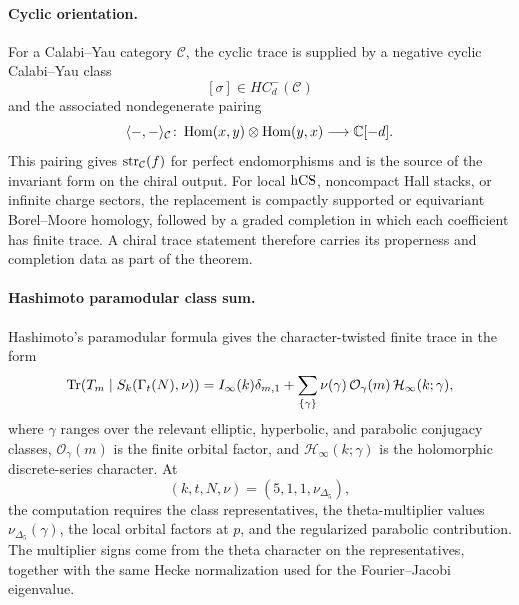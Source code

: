 \paragraph{Cyclic orientation.}
For a Calabi--Yau category \(\mathcal C\), the cyclic trace is supplied
by a negative cyclic Calabi--Yau class
\[
  [\sigma]\in HC^-_d(\mathcal C)
\]
and the associated nondegenerate pairing
\[
  \langle-,-\rangle_{\mathcal C}\colon
  \operatorname{Hom}(x,y)\otimes\operatorname{Hom}(y,x)\longrightarrow
  \mathbb{C}[-d].
\]
This pairing gives \(\operatorname{str}_{\mathcal C}(f)\) for perfect endomorphisms
and is the source of the invariant form on the chiral output.  For
local \(\mathrm{hCS}\), noncompact Hall stacks, or infinite charge sectors, the
replacement is compactly supported or equivariant Borel--Moore
homology, followed by a graded completion in which each coefficient has
finite trace.  A chiral trace statement therefore carries its
properness and completion data as part of the theorem.

\paragraph{Hashimoto paramodular class sum.}
Hashimoto's paramodular formula gives the character-twisted finite
trace in the form
\[
\operatorname{Tr}\!\left(T_m\mid S_k(\Gamma_t(N),\nu)\right)
 =
 I_\infty(k)\delta_{m,1}
 +\sum_{\{\gamma\}}
   \nu(\gamma)\,\mathcal O_\gamma(m)\,
   \mathcal H_\infty(k;\gamma),
\]
where \(\gamma\) ranges over the relevant elliptic, hyperbolic, and
parabolic conjugacy classes, \(\mathcal O_\gamma(m)\) is the finite
orbital factor, and \(\mathcal H_\infty(k;\gamma)\) is the holomorphic
discrete-series character.  At
\[
  (k,t,N,\nu)=(5,1,1,\nu_{\Delta_5}),
\]
the computation requires the class representatives, the theta-multiplier
values \(\nu_{\Delta_5}(\gamma)\), the local orbital factors at \(p\),
and the regularized parabolic contribution.  The multiplier signs come
from the theta character on the representatives, together with the same
Hecke normalization used for the Fourier--Jacobi eigenvalue.

